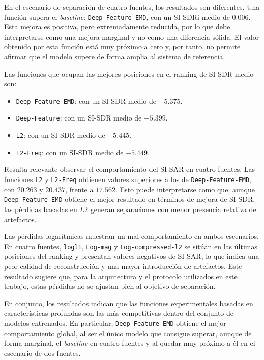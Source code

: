 En el escenario de separación de cuatro fuentes, los resultados son diferentes. Una función supera el \textit{baseline}: \texttt{Deep-Feature-EMD}, con un SI-SDRi medio de \(0.006\). Esta mejora es positiva, pero extremadamente reducida, por lo que debe interpretarse como una mejora marginal y no como una diferencia sólida. El valor obtenido por esta función está muy próximo a cero y, por tanto, no permite afirmar que el modelo supere de forma amplia al sistema de referencia.

Las funciones que ocupan las mejores posiciones en el ranking de SI-SDR medio son:

\begin{itemize}
\item \texttt{Deep-Feature-EMD}: con un SI-SDR medio de \(-5.375\).

\item \texttt{Deep-Feature}: con un SI-SDR medio de \(-5.399\).

\item \texttt{L2}: con un SI-SDR medio de \(-5.445\).

\item \texttt{L2-Freq}: con un SI-SDR medio de \(-5.449\).

\end{itemize}

Resulta relevante observar el comportamiento del SI-SAR en cuatro fuentes. Las funciones \texttt{L2} y \texttt{L2-Freq} obtienen valores superiores a los de \texttt{Deep-Feature-EMD}, con \(20.263\) y \(20.437\), frente a \(17.562\). Esto puede interpretarse como que, aunque \texttt{Deep-Feature-EMD} obtiene el mejor resultado en términos de mejora de SI-SDR, las pérdidas basadas en \(L2\) generan separaciones con menor presencia relativa de artefactos.

Las pérdidas logarítmicas muestran un mal comportamiento en ambos escenarios. En cuatro fuentes, \texttt{logl1}, \texttt{Log-mag} y \texttt{Log-compressed-l2} se sitúan en las últimas posiciones del ranking y presentan valores negativos de SI-SAR, lo que indica una peor calidad de reconstrucción y una mayor introducción de artefactos. Este resultado sugiere que, para la arquitectura y el protocolo utilizados en este trabajo, estas pérdidas no se ajustan bien al objetivo de separación.

En conjunto, los resultados indican que las funciones experimentales basadas en características profundas son las más competitivas dentro del conjunto de modelos entrenados. En particular, \texttt{Deep-Feature-EMD} obtiene el mejor comportamiento global, al ser el único modelo que consigue superar, aunque de forma marginal, el \textit{baseline} en cuatro fuentes y al quedar muy próximo a él en el escenario de dos fuentes.

